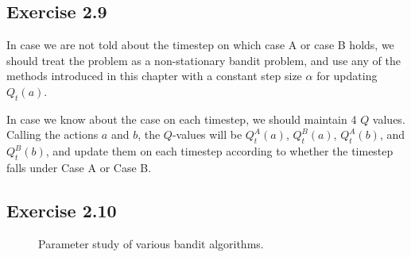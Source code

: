 \documentclass[10pt]{article}
\begin{document}
	\subsection*{Exercise 2.9}
	\label{ss:2.9}
	In case we are not told about the timestep on which case A or case B holds, we should treat the problem as a non-stationary bandit problem, and use any of the methods introduced in this chapter with a constant step size $\alpha$ for updating $Q_t(a)$.\par\noindent
	In case we know about the case on each timestep, we should maintain 4 $Q$ values. Calling the actions $a$ and $b$, the $Q$-values will be $Q_t^A(a)$, $Q_t^B(a)$, $Q_t^A(b)$, and $Q_t^B(b)$, and update them on each timestep according to whether the timestep falls under Case A or Case B.
	\subsection*{Exercise 2.10}
	\label{ss:2.10}
	\begin{figure}[H]
		\centering
		\caption{Parameter study of various bandit algorithms.}
	\end{figure}
\end{document}
